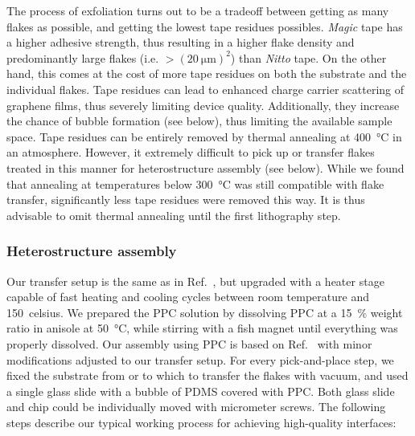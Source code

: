 The process of exfoliation turns out to be a tradeoff between getting as many flakes as possible, and getting the lowest tape residues possibles.
% 
\textit{Magic} tape has a higher adhesive strength, thus resulting in a higher flake density and predominantly large flakes (i.e. $>(\SI{20}{\micro\meter})^2$) than \textit{Nitto} tape.
% 
On the other hand, this comes at the cost of more tape residues on both the substrate and the individual flakes.
% 
Tape residues can lead to enhanced charge carrier scattering of graphene films, thus severely limiting device quality.
% 
Additionally, they increase the chance of bubble formation (see below), thus limiting the available sample space.
% 
Tape residues can be entirely removed by thermal annealing at \SI{400}{\celsius} in  an  atmosphere.
% 
However, it extremely difficult to pick up or transfer flakes treated in this manner for heterostructure assembly (see below).
% 
While we found that annealing at temperatures below \SI{300}{\celsius} was still compatible with flake transfer, significantly less tape residues were removed this way.
% 
It is thus advisable to omit thermal annealing until the first lithography step.

\subsubsection{Heterostructure assembly}

Our transfer setup is the same as in Ref.~\cite{castellanos-gomezDeterministicTransferTwodimensional2014}, but upgraded with a heater stage capable of fast heating and cooling cycles between room temperature and \SI{150}{celsius}.
% 
We prepared the PPC solution by dissolving PPC at a \SI{15}{\percent} weight ratio in anisole at \SI{50}{\celsius}, while stirring with a fish magnet until everything was properly dissolved.
% 
Our assembly using PPC is based on Ref.~\cite{pizzoccheroHotPickupTechnique2016} with minor modifications adjusted to our transfer setup.
% 
For every pick-and-place step, we fixed the substrate from or to which to transfer the flakes with vacuum, and used a single glass slide with a bubble of PDMS covered with PPC.
%
Both glass slide and chip could be individually moved with micrometer screws.
%
The following steps describe our typical working process for achieving high-quality interfaces:

